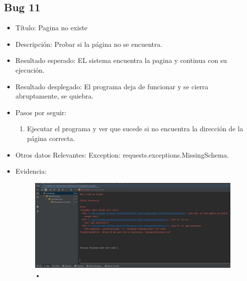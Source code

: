 \documentclass[conference]{IEEEtran}
\begin{document}
\subsection*{Bug 11}
\begin{itemize}
\item Título: Pagina no existe

\item Descripción: Probar si la página no se encuentra.

\item Resultado esperado: EL sistema encuentra la pagina y continua con su ejecución.

\item Resultado desplegado: El programa deja de funcionar y se cierra abruptamente, se quiebra. 

\item Pasos por seguir: 
\begin{enumerate}
\item Ejecutar el programa y ver que sucede si no encuentra la dirección de la página correcta.
\end{enumerate}
\item Otros datos Relevantes: Exception: requests.exceptions.MissingSchema.
\item Evidencia:
\begin{figure}[H]
\centering
\includegraphics[scale=0.2]{imagenes/padron_no_existe.jpeg}
\caption{•}
\end{figure}

\end{itemize}





\normalsize
\end{document}
